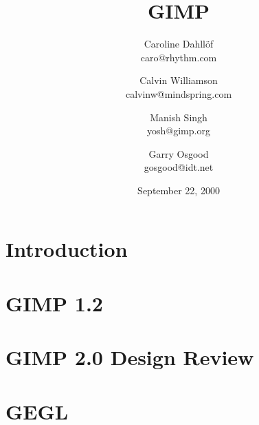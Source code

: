 \documentclass{report}
\begin{document}
\begin{titlepage}
\title{\huge GIMP}
\author{Caroline Dahll\"{o}f\\
caro@rhythm.com 
\and Calvin Williamson\\
calvinw@mindspring.com
\and Manish Singh\\
yosh@gimp.org
\and Garry Osgood\\
gosgood@idt.net}
\date{September 22, 2000}
\maketitle
\end{titlepage}
\tableofcontents


% 
%



\chapter{Introduction}
\label{ch:Introduction}



\chapter{GIMP 1.2}
\label{ch:GIMP}


\chapter{GIMP 2.0 Design Review}
\label{ch:GIMP_2.0}



\chapter{GEGL}
\label{ch:GEGL}

\end{document}
